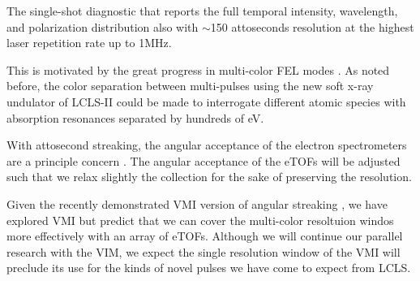 The single-shot diagnostic that reports the full temporal intensity, wavelength, and polarization distribution also with $\sim$150 attoseconds resolution at the highest laser repetition rate up to 1MHz.  

This is motivated by the great progress in multi-color FEL modes \cite{Lutman13_twocolor,Marinelli13_twocolor,Allaria2014,Marinelli2015,Prince2016,Lutman2016,Marinelli2016}.
As noted before, the color separation between multi-pulses using the new soft x-ray undulator of LCLS-II could be made to interrogate different atomic species with absorption resonances separated by hundreds of eV.


With attosecond streaking, the angular acceptance of the electron spectrometers are a principle concern \cite{Worner2018}.
The angular acceptance of the eTOFs will be adjusted such that we relax slightly the collection for the sake of preserving the resolution.

Given the recently demonstrated VMI version of angular streaking \cite{attoclockVMI2013}, we have explored VMI \cite{James2018} but predict that we can cover the multi-color resoltuion windos more effectively with an array of eTOFs.
Although we will continue our parallel research with the VIM, we expect the single resolution window of the VMI will preclude its use for the kinds of novel pulses we have come to expect from LCLS.


